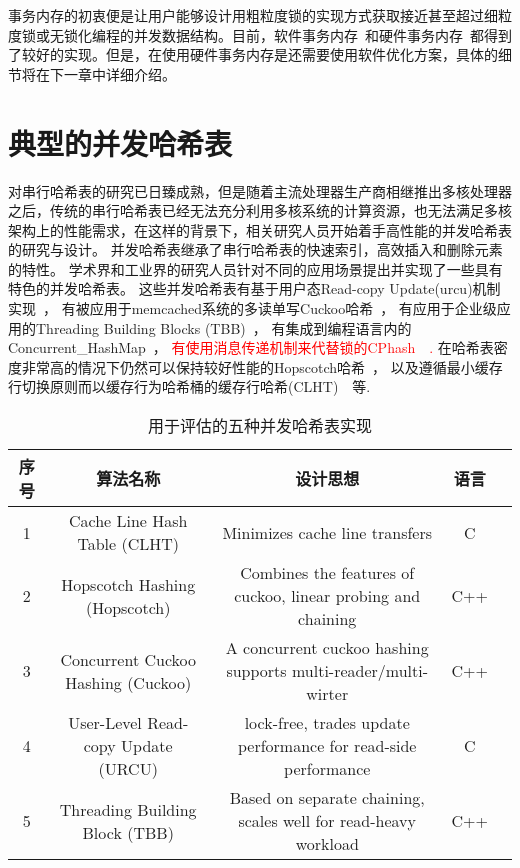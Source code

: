 事务内存的初衷便是让用户能够设计用粗粒度锁的实现方式获取接近甚至超过细粒度锁或无锁化编程的并发数据结构。目前，软件事务内存~\cite{todo}和硬件事务内存~\cite{todo}都得到了较好的实现。但是，在使用硬件事务内存是还需要使用软件优化方案，具体的细节将在下一章中详细介绍。


\section{典型的并发哈希表}

对串行哈希表的研究已日臻成熟，但是随着主流处理器生产商相继推出多核处理器之后，传统的串行哈希表已经无法充分利用多核系统的计算资源，也无法满足多核架构上的性能需求，在这样的背景下，相关研究人员开始着手高性能的并发哈希表的研究与设计。
并发哈希表继承了串行哈希表的快速索引，高效插入和删除元素的特性。
学术界和工业界的研究人员针对不同的应用场景提出并实现了一些具有特色的并发哈希表。
这些并发哈希表有基于用户态Read-copy Update(urcu)机制实现~\cite{urcu}，
有被应用于memcached系统的多读单写Cuckoo哈希~\cite{memc3}，
有应用于企业级应用的Threading Building Blocks (TBB)~\cite{tbb}，
有集成到编程语言内的Concurrent\_HashMap~\cite{oracle}，
\textcolor{red}{有使用消息传递机制来代替锁的CPhash~\cite{metreveli2012cphash}~.}
在哈希表密度非常高的情况下仍然可以保持较好性能的Hopscotch哈希~\cite{hopscotch}，
以及遵循最小缓存行切换原则而以缓存行为哈希桶的缓存行哈希(CLHT)~\cite{clht}~等.

\begin{table}[htbp]
  \caption{用于评估的五种并发哈希表实现}
\label{tab:concurrent_hash}
\footnotesize
\centering
\begin{tabular}{ccccc}
\toprule
序号 &   算法名称   &   设计思想     &   语言\\
\midrule
1  &  Cache Line Hash Table (CLHT)   &  Minimizes cache line transfers \cite{clht} &   C\\

2  &  Hopscotch Hashing (Hopscotch)   &  Combines the features of cuckoo, linear probing and chaining \cite{hopscotch}     &   C++ \\

3  &   Concurrent Cuckoo Hashing (Cuckoo)   &  A concurrent cuckoo hashing supports multi-reader/multi-wirter \cite{cuckoo}  &   C++ \\

4  &   User-Level Read-copy Update (URCU)   &   lock-free, trades update performance for read-side performance \cite{urcu}   &   C \\

5  &   Threading Building Block (TBB)   &   Based on separate chaining, scales well for read-heavy workload \cite{tbb}        &   C++ \\
\bottomrule
\end{tabular}
\end{table}

